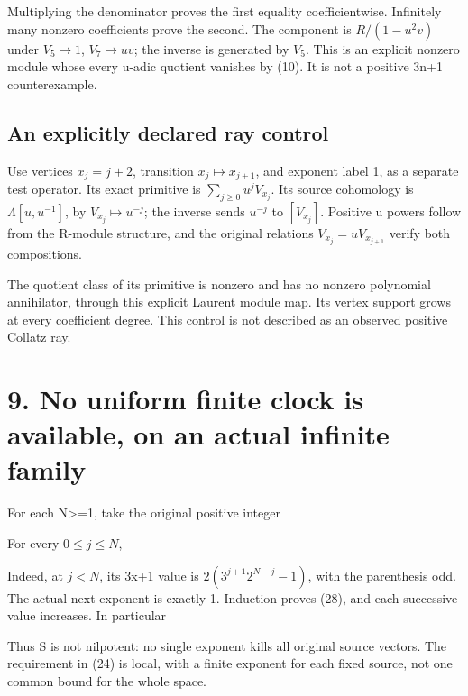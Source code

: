 
Multiplying the denominator proves the first equality coefficientwise.
Infinitely many nonzero coefficients prove the second. The component is
\(R/(1-u^2v)\) under \(V_5\mapsto1\), \(V_7\mapsto uv\); the inverse is
generated by \(V_5\). This is an explicit nonzero module whose every
u-adic quotient vanishes by (10). It is not a positive 3n+1
counterexample.

\subsection{An explicitly declared ray control}

Use vertices \(x_j=j+2\), transition \(x_j\mapsto x_{j+1}\), and
exponent label 1, as a separate test operator. Its exact primitive is
\(\sum_{j\ge0}u^jV_{x_j}\). Its source cohomology is
\(\Lambda[u,u^{-1}]\), by \(V_{x_j}\mapsto u^{-j}\); the inverse sends
\(u^{-j}\) to \([V_{x_j}]\). Positive u powers follow from the R-module
structure, and the original relations \(V_{x_j}=uV_{x_{j+1}}\) verify
both compositions.

The quotient class of its primitive is nonzero and has no nonzero
polynomial annihilator, through this explicit Laurent module map. Its
vertex support grows at every coefficient degree. This control is not
described as an observed positive Collatz ray.

\section{9. No uniform finite clock is available, on an actual infinite
family}

For each N\textgreater=1, take the original positive integer


For every \(0\le j\le N\),


Indeed, at \(j<N\), its 3x+1 value is \(2(3^{j+1}2^{N-j}-1)\), with the
parenthesis odd. The actual next exponent is exactly 1. Induction proves
(28), and each successive value increases. In particular


Thus S is not nilpotent: no single exponent kills all original source
vectors. The requirement in (24) is local, with a finite exponent for
each fixed source, not one common bound for the whole space.

